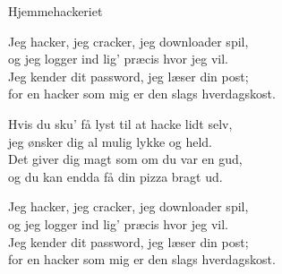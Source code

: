 \begin{song}{Hjemmehackeriet}
  \begin{SBChorus}
    Jeg hacker, jeg cracker, jeg downloader spil,\\
    og jeg logger ind lig' præcis hvor jeg vil.\\
    Jeg kender dit password, jeg læser din post;\\
    for en hacker som mig er den slags hverdagskost.
  \end{SBChorus}


  \begin{SBVerse}
    Hvis du sku' få lyst til at hacke lidt selv,\\
    jeg ønsker dig al mulig lykke og held.\\
    Det giver dig magt som om du var en gud,\\
    og du kan endda få din pizza bragt ud.
  \end{SBVerse}

  \begin{SBChorus}
    Jeg hacker, jeg cracker, jeg downloader spil,\\
    og jeg logger ind lig' præcis hvor jeg vil.\\
    Jeg kender dit password, jeg læser din post;\\
    for en hacker som mig er den slags hverdagskost.
  \end{SBChorus}

\end{song}
